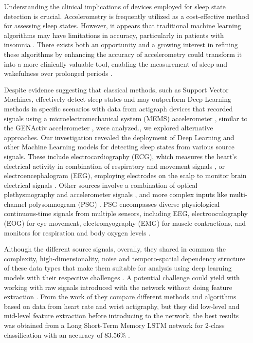 \documentclass{article}
\begin{document}
Understanding the clinical implications of devices employed for sleep state detection is crucial. Accelerometry is frequently utilized as a cost-effective method for assessing sleep states. However, it appears that traditional machine learning algorithms may have limitations in accuracy, particularly in patients with insomnia \cite{Sundararajan2021}. There exists both an opportunity and a growing interest in refining these algorithms by enhancing the accuracy of accelerometry could transform it into a more clinically valuable tool, enabling the measurement of sleep and wakefulness over prolonged periods \cite{Sundararajan2021}.

Despite evidence suggesting that classical methods, such as Support Vector Machines, effectively detect sleep states and may outperform Deep Learning methods in specific scenarios with data from actigraph devices that recorded signals using a microelectromechanical system (MEMS) accelerometer \cite{teLindert2020}, similar to the GENActiv accelerometer \cite{Sundararajan2021}, were analyzed., we explored alternative approaches. Our investigation revealed the deployment of Deep Learning and other Machine Learning models for detecting sleep states from various source signals. These include electrocardiography (ECG), which measures the heart's electrical activity in combination of respiratory and movement signals \cite{Stuburic2020}, or electroencephalogram (EEG), employing electrodes on the scalp to monitor brain electrical signals \cite{Sekkal2022}. Other sources involve a combination of optical plethysmography and accelerometer signals \cite{Beattie_2017} \cite{Fedorin2019}, and more complex inputs like multi-channel polysomnogram (PSG) \cite{Li2021}. PSG encompasses diverse physiological continuous-time signals from multiple sensors, including EEG, electrooculography (EOG) for eye movement, electromyography (EMG) for muscle contractions, and monitors for respiration and body oxygen levels \cite{Li2021}.

Although the different source signals, overally, they shared in common the complexity, high-dimensionality, noise and temporo-spatial dependency structure of these data types that make them suitable for analysis using deep learning models with their respective challenges \cite{thomas2018}. A potential challenge could yield with working with raw signals introduced with the network without doing feature extraction \cite{Stuburic2020}. From the work of \cite{michielli2019} they compare different methods and algorithms based on data from heart rate and wrist actigraphy, but they did low-level and mid-level feature extraction before introducing to the network, the best results was obtained from a Long Short-Term Memory LSTM network for 2-class classification with an accuracy of 83.56\% \cite{michielli2019}.
\end{document}
